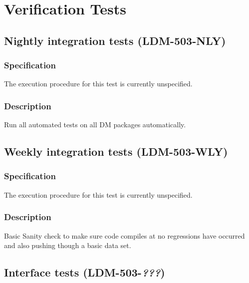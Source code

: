 















\section{Verification Tests \label{sect:vts}}

\subsection{Nightly integration tests (\textbf{LDM-503-NLY})}
\subsubsection{Specification}
The execution procedure for this test is currently unspecified.
\subsubsection{Description}
Run all automated tests on all DM packages automatically.

\subsection{Weekly integration tests (\textbf{LDM-503-WLY})}
\subsubsection{Specification}
The execution procedure for this test is currently unspecified.
\subsubsection{Description}
Basic Sanity check to make sure code compiles at no regressions have occurred
and also pushing though a basic data set.

\subsection{Interface tests (\textbf{LDM-503-\textit{???}})}
